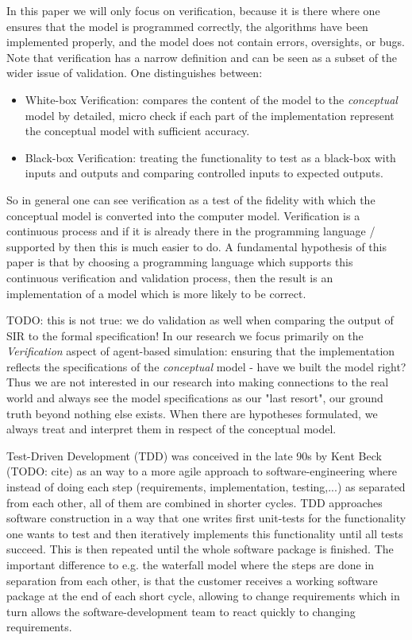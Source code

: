 In this paper we will only focus on verification, because it is there where one ensures that the model is programmed correctly, the algorithms have been implemented properly, and the model does not contain errors, oversights, or bugs. Note that verification has a narrow definition and can be seen as a subset of the wider issue of validation. One distinguishes between:

\begin{itemize}
	\item White-box Verification: compares the content of the model to the \textit{conceptual} model by detailed, micro check if each part of the implementation represent the conceptual model with sufficient accuracy. 
	\item Black-box Verification: treating the functionality to test as a black-box with inputs and outputs and comparing controlled inputs to expected outputs.
\end{itemize}

So in general one can see verification as a test of the fidelity with which the conceptual model is converted into the computer model. Verification is a continuous process and if it is already there in the programming language / supported by then this is much easier to do. A fundamental hypothesis of this paper is that by choosing a programming language which supports this continuous verification and validation process, then the result is an implementation of a model which is more likely to be correct.

TODO: this is not true: we do validation as well when comparing the output of SIR to the formal specification!
In our research we focus primarily on the \textit{Verification} aspect of agent-based simulation: ensuring that the implementation reflects the specifications of the \textit{conceptual} model - have we built the model right? Thus we are not interested in our research into making connections to the real world and always see the model specifications as our "last resort", our ground truth beyond nothing else exists. When there are hypotheses formulated, we always treat and interpret them in respect of the conceptual model.

Test-Driven Development (TDD) was conceived in the late 90s by Kent Beck (TODO: cite) as an way to a more agile approach to software-engineering where instead of doing each step (requirements, implementation, testing,...) as separated from each other, all of them are combined in shorter cycles. TDD approaches software construction in a way that one writes first unit-tests for the functionality one wants to test and then iteratively implements this functionality until all tests succeed. This is then repeated until the whole software package is finished. The important difference to e.g. the waterfall model where the steps are done in separation from each other, is that the customer receives a working software package at the end of each short cycle, allowing to change requirements which in turn allows the software-development team to react quickly to changing requirements.

